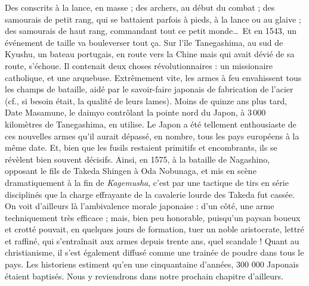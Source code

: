 Des conscrits à la lance, en masse ; des archers, au début du combat ; des
samourais de petit rang, qui se battaient parfois à pieds, à la lance ou au
glaive ; des samourais de haut rang, commandant tout ce petit monde\dots\ Et en
1543, un événement de taille va bouleverser tout ça. Sur l'île Tanegashima, au
sud de Kyushu, un bateau portugais, en route vers la Chine mais qui avait dévié
de sa route, s'échoue.  Il contenait deux choses révolutionnaires : un
missionaire catholique, et une arquebuse. Extrêmement vite, les armes à feu
envahissent tous les champs de bataille, aidé par le savoir-faire japonais de
fabrication de l'acier (cf., si besoin était, la qualité de leurs lames). Moins
de quinze ans plus tard, Date Masamune, le daimyo contrôlant la pointe nord du
Japon, à 3\,000 kilomètres de Tanegashima, en utilise. Le Japon a été tellement
enthousiaste de ces nouvelles armes qu'il aurait dépassé, en nombre, tous les
pays européens à la même date.  Et, bien que les fusils restaient primitifs et
encombrants, ils se révèlent bien souvent décisifs. Ainsi, en 1575, à la
bataille de Nagashino, opposant le fils de Takeda Shingen à Oda Nobunaga, et
mis en scène dramatiquement à la fin de \emph{Kagemusha}, c'est par une
tactique de tirs en série disciplinés que la charge effrayante de la cavalerie
lourde des Takeda fut cassée. On voit d'ailleurs là l'ambivalence morale
japonaise : d'un côté, une arme techniquement très efficace ; mais, bien peu
honorable, puisqu'un paysan boueux et crotté pouvait, en quelques jours de
formation, tuer un noble aristocrate, lettré et raffiné, qui s'entraînait aux
armes depuis trente ans, quel scandale ! Quant au christianisme, il s'est
également diffusé comme une trainée de poudre dans tous le pays. Les historiens
estiment qu'en une cinquantaine d'années, 300 000 Japonais étaient baptisés.
Nous y reviendrons dans notre prochain chapitre d'ailleurs. 

